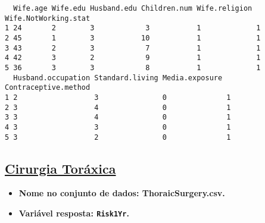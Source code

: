 \documentclass[11pt]{article}
\begin{document}
\begin{verbatim}
  Wife.age Wife.edu Husband.edu Children.num Wife.religion Wife.NotWorking.stat
1 24       2        3            3           1             1                   
2 45       1        3           10           1             1                   
3 43       2        3            7           1             1                   
4 42       3        2            9           1             1                   
5 36       3        3            8           1             1                   
  Husband.occupation Standard.living Media.exposure Contraceptive.method
1 2                  3               0              1                   
2 3                  4               0              1                   
3 3                  4               0              1                   
4 3                  3               0              1                   
5 3                  2               0              1                   
\end{verbatim}
\clearpage

\subsection{\href{https://archive.ics.uci.edu/ml/datasets/Thoracic+Surgery+Data}{Cirurgia Toráxica}}
\label{sec:orgdb1834d}
\begin{itemize}
\item \textbf{Nome no conjunto de dados: \textbf{ThoraicSurgery.csv}.}
\item \textbf{Variável resposta:  \texttt{Risk1Yr}.}
\end{itemize}
\end{document}
